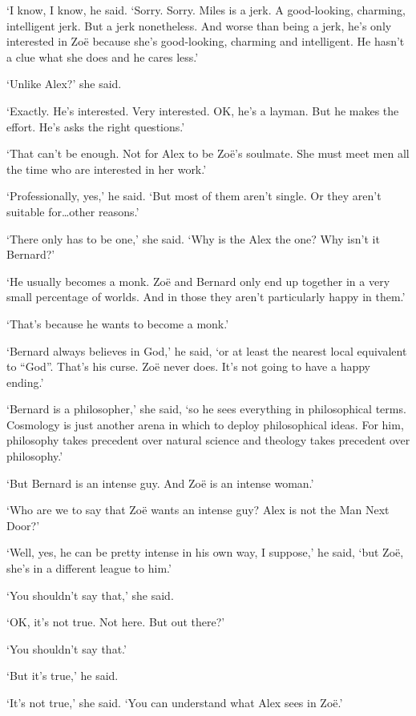 `I know, I know, he said. `Sorry. Sorry. Miles is a jerk. A good-looking, charming, intelligent jerk. But a
jerk nonetheless. And worse than being a jerk, he's only interested
in Zo{\"e} because she's good-looking, charming and intelligent. He
hasn't a clue what she does and he cares less.'

`Unlike Alex?' she said.

`Exactly. He's interested. Very interested. OK, he's a layman. But
he makes the effort. He's asks the right questions.'

`That can't be enough. Not for Alex to be Zo{\"e}'s
soulmate. She must meet men all the time who are interested in her
work.'

`Professionally, yes,' he said. `But most of them aren't single. Or they aren't
suitable for\dots other reasons.'

`There only has to be one,' she said. `Why is the Alex the one?
Why isn't it Bernard?'

`He usually becomes a monk. Zo{\"e} and Bernard only end up together
in a very small percentage of worlds. And in those they aren't particularly
happy in them.'

`That's because he wants to become a monk.'

`Bernard always believes in God,' he said, `or at least the nearest local equivalent to ``God''. That's his curse. Zo{\"e}
never does. It's not going to have a happy ending.'

`Bernard is a philosopher,' she said, `so he sees everything in
philosophical terms. Cosmology is just another arena in which to
deploy philosophical ideas. For him, philosophy takes precedent
over natural science and theology takes precedent over philosophy.'

`But Bernard is an intense guy. And Zo{\"e} is an intense woman.'

`Who are we to say that Zo{\"e} wants an intense guy? Alex is not
the Man Next Door?'

`Well, yes, he can be pretty intense in his own way, I suppose,' he said, `but
Zo{\"e}, she's in a different league to him.'

`You shouldn't say that,' she said.

`OK, it's not true. Not here. But out there?'

`You shouldn't say that.'

`But it's true,' he said.

`It's not true,' she said. `You can understand what Alex sees in Zo{\"e}.'


